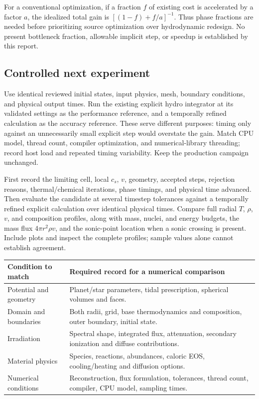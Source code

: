 \documentclass[english,a4paper]{my_memo}
\begin{document}
For a conventional optimization, if a fraction $f$ of existing cost is accelerated by a factor $a$, the idealized total gain is $[(1-f)+f/a]^{-1}$. Thus phase fractions are needed before prioritizing source optimization over hydrodynamic redesign. No present bottleneck fraction, allowable implicit step, or speedup is established by this report.

\subsection{Controlled next experiment}
Use identical reviewed initial states, input physics, mesh, boundary conditions, and physical output times. Run the existing explicit hydro integrator at its validated settings as the performance reference, and a temporally refined calculation as the accuracy reference. These serve different purposes: timing only against an unnecessarily small explicit step would overstate the gain. Match CPU model, thread count, compiler optimization, and numerical-library threading; record host load and repeated timing variability. Keep the production campaign unchanged.

First record the limiting cell, local $c_s$, $v$, geometry, accepted steps, rejection reasons, thermal/chemical iterations, phase timings, and physical time advanced. Then evaluate the candidate at several timestep tolerances against a temporally refined explicit calculation over identical physical times. Compare full radial $T$, $\rho$, $v$, and composition profiles, along with mass, nuclei, and energy budgets, the mass flux $4\pi r^2\rho v$, and the sonic-point location when a sonic crossing is present. Include plots and inspect the complete profiles; sample values alone cannot establish agreement.

\noindent\begin{tabularx}{\textwidth}{@{}p{}X@{}}
\toprule
Condition to match & Required record for a numerical comparison\\
\midrule
Potential and geometry & Planet/star parameters, tidal prescription, spherical volumes and faces.\\
Domain and boundaries & Both radii, grid, base thermodynamics and composition, outer boundary, initial state.\\
Irradiation & Spectral shape, integrated flux, attenuation, secondary ionization and diffuse contributions.\\
Material physics & Species, reactions, abundances, caloric EOS, cooling/heating and diffusion options.\\
Numerical conditions & Reconstruction, flux formulation, tolerances, thread count, compiler, CPU model, sampling times.\\
\bottomrule
\end{tabularx}
\end{document}
